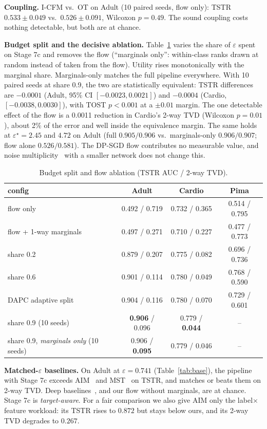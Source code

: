 \documentclass[journal]{IEEEtran}
\newcommand{\eps}{\varepsilon}
\begin{document}
\textbf{Coupling.} I-CFM vs.\ OT on Adult (10 paired seeds, flow only): TSTR $0.533\pm0.049$ vs.\ $0.526\pm0.091$, Wilcoxon $p=0.49$. The sound coupling costs nothing detectable, but both are at chance.

\textbf{Budget split and the decisive ablation.} Table~\ref{tab:split} varies the share of $\eps$ spent on Stage 7c and removes the flow (``marginals only'': within-class ranks drawn at random instead of taken from the flow). Utility rises monotonically with the marginal share. Marginals-only matches the full pipeline everywhere. With 10 paired seeds at share 0.9, the two are statistically equivalent: TSTR differences are $-0.0001$ (Adult, 95\% CI $[-0.0023,0.0021]$) and $-0.0004$ (Cardio, $[-0.0038,0.0030]$), with TOST $p<0.001$ at a $\pm0.01$ margin. The one detectable effect of the flow is a 0.0011 reduction in Cardio's 2-way TVD (Wilcoxon $p=0.01$), about 2\% of the error and well inside the equivalence margin. The same holds at $\eps^\star=2.45$ and $4.72$ on Adult (full $0.905/0.906$ vs.\ marginals-only $0.906/0.907$; flow alone $0.526/0.581$). The DP-SGD flow contributes no measurable value, and noise multiplicity~\cite{dockhorn2023dpdm} with a smaller network does not change this.

\begin{table}[t]\centering\caption{Budget split and flow ablation (TSTR AUC / 2-way TVD).}\label{tab:split}
\setlength{\tabcolsep}{3pt}
\begin{tabular}{lccc}\toprule
config & Adult & Cardio & Pima\\\midrule
flow only & 0.492 / 0.719 & 0.732 / 0.365 & 0.514 / 0.795\\
flow + 1-way marginals & 0.497 / 0.271 & 0.710 / 0.227 & 0.477 / 0.773\\
share 0.2 & 0.879 / 0.207 & 0.775 / 0.082 & 0.696 / 0.736\\
share 0.6 & 0.901 / 0.114 & 0.780 / 0.049 & 0.768 / 0.590\\
DAPC adaptive split & 0.904 / 0.116 & 0.780 / 0.070 & 0.729 / 0.601\\
share 0.9 (10 seeds) & \textbf{0.906} / 0.096 & 0.779 / \textbf{0.044} & --\\
share 0.9, \emph{marginals only} (10 seeds) & 0.906 / \textbf{0.095} & 0.779 / 0.046 & --\\\bottomrule
\end{tabular}\end{table}

\textbf{Matched-$\eps$ baselines.} On Adult at $\eps=0.741$ (Table~\ref{tab:base}), the pipeline with Stage 7c exceeds AIM~\cite{mckenna2022aim} and MST~\cite{mckenna2021winning} on TSTR, and matches or beats them on 2-way TVD. Deep baselines~\cite{rosenblatt2020dpsynth,jordon2019pategan,xu2019ctgan}, and our flow without marginals, are at chance. Stage 7c is \emph{target-aware}. For a fair comparison we also give AIM only the label$\times$feature workload: its TSTR rises to $0.872$ but stays below ours, and its 2-way TVD degrades to $0.267$.
\end{document}
